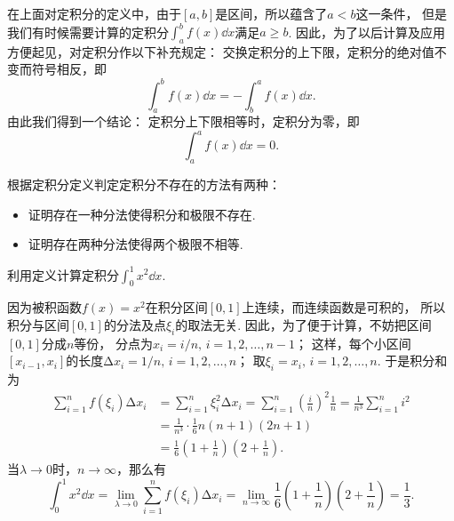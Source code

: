 在上面对定积分的定义中，由于\([a,b]\)是区间，所以蕴含了\(a<b\)这一条件，
但是我们有时候需要计算的定积分\(\int_a^b f(x) \dd{x}\)满足\(a \geq b\).
因此，为了以后计算及应用方便起见，对定积分作以下补充规定：
交换定积分的上下限，定积分的绝对值不变而符号相反，即
\begin{equation}\label{equation:定积分.交换上下限改变定积分的符号}
	\int_a^b f(x) \dd{x}
	= - \int_b^a f(x) \dd{x}.
\end{equation}
由此我们得到一个结论：
定积分上下限相等时，定积分为零，即
\begin{equation}\label{equation:定积分.上下限相等的定积分为零}
    \int_a^a f(x) \dd{x} = 0.
\end{equation}

根据定积分定义判定定积分不存在的方法有两种：
\begin{itemize}
	\item 证明存在一种分法使得积分和极限不存在.
	\item 证明存在两种分法使得两个极限不相等.
\end{itemize}

\begin{example}
利用定义计算定积分\(\int_0^1 x^2 \dd{x}\).
\begin{solution}
因为被积函数\(f(x) = x^2\)在积分区间\([0,1]\)上连续，而连续函数是可积的，
所以积分与区间\([0,1]\)的分法及点\(\xi_i\)的取法无关.
因此，为了便于计算，不妨把区间\([0,1]\)分成\(n\)等份，
分点为\(x_i = i/n,\,i=1,2,\dotsc,n-1\)；
这样，每个小区间\([x_{i-1},x_i]\)的长度\(\increment x_i = 1/n,\,i=1,2,\dotsc,n\)；
取\(\xi_i=x_i,\,i=1,2,\dotsc,n\).
于是积分和为\begin{align*}
	\sum_{i=1}^n f(\xi_i) \increment x_i
	&= \sum_{i=1}^n \xi_i^2 \increment x_i
	= \sum_{i=1}^n \left(\frac{i}{n}\right)^2 \frac{1}{n}
	= \frac{1}{n^3} \sum_{i=1}^n i^2 \\
	&= \frac{1}{n^3} \cdot \frac{1}{6} n(n+1)(2n+1) \\
	&= \frac{1}{6} \left(1+\frac{1}{n}\right) \left(2+\frac{1}{n}\right).
\end{align*}
当\(\lambda\to0\)时，\(n\to\infty\)，那么有\begin{equation*}
	\int_0^1 x^2 \dd{x}
	= \lim_{\lambda\to0} \sum_{i=1}^n f(\xi_i) \increment x_i
	= \lim_{n\to\infty}
		\frac{1}{6} \left(1+\frac{1}{n}\right) \left(2+\frac{1}{n}\right)
	= \frac{1}{3}.
\end{equation*}
\end{solution}
\end{example}

